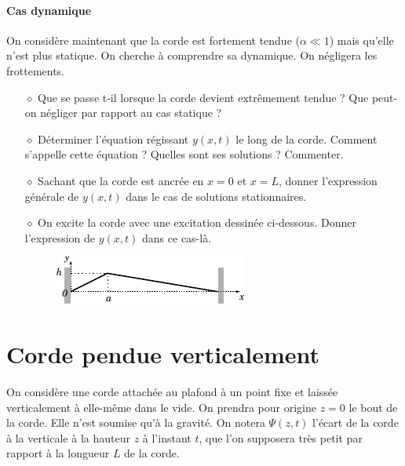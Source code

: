 \documentclass{report}
\begin{document}
\paragraph{Cas dynamique} On considère maintenant que la corde est fortement tendue ($\alpha\ll1$) mais qu'elle n'est plus statique. On cherche à comprendre sa dynamique. On négligera les frottements.

\begin{itemize}

	\item[$\diamond$] Que se passe t-il lorsque la corde devient extrêmement tendue ? Que peut-on négliger par rapport au cas statique ?

	\item[$\diamond$] Déterminer l'équation régissant $y(x,t)$ le long de la corde. Comment s'appelle cette équation ? Quelles sont ses solutions ? Commenter.
	
	\item[$\diamond$] Sachant que la corde est ancrée en $x=0$ et $x=L$, donner l'expression générale de $y(x,t)$ dans le cas de solutions stationnaires. 
	
	\item[$\diamond$] On excite la corde avec une excitation dessinée ci-dessous. Donner l'expression de $y(x,t)$ dans ce cas-là.
	
	\begin{figure}[h!]
	\centering
		\includegraphics[scale=1.5]{onde2.pdf}
	\end{figure}

	
\end{itemize}

\newpage

\section*{Corde pendue verticalement}

On considère une corde attachée au plafond à un point fixe et laissée verticalement à elle-même dans le vide. On prendra pour origine $z=0$ le bout de la corde. Elle n'est soumise qu'à la gravité. On notera $\Psi(z,t)$ l'écart de la corde à la verticale à la hauteur $z$ à l'instant $t$, que l'on supposera très petit par rapport à la longueur $L$ de la corde.
\end{document}
